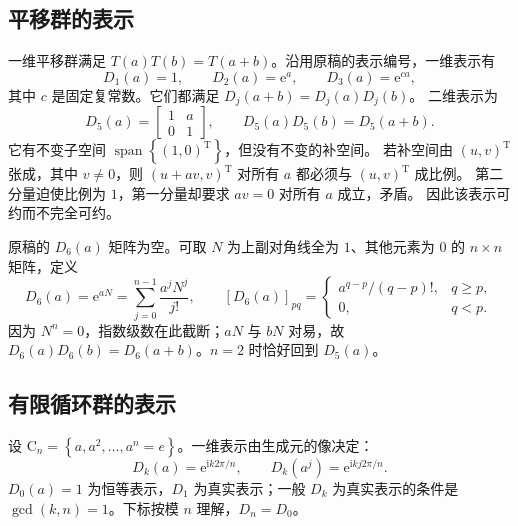 \subsection{平移群的表示}
一维平移群满足 $T\left(a\right)T\left(b\right)=T\left(a+b\right)$。沿用原稿的表示编号，一维表示有
\begin{equation}
D_1\left(a\right)=1,\qquad D_2\left(a\right)=\mathrm{e}^a,\qquad D_3\left(a\right)=\mathrm{e}^{ca},
\end{equation}
其中 $c$ 是固定复常数。它们都满足 $D_j\left(a+b\right)=D_j\left(a\right)D_j\left(b\right)$。
二维表示为
\begin{equation}
D_5\left(a\right)=\begin{bmatrix}1&a\\0&1\end{bmatrix},\qquad
D_5\left(a\right)D_5\left(b\right)=D_5\left(a+b\right).
\end{equation}
它有不变子空间 $\operatorname{span}\left\{\left(1,0\right)^{\mathrm{T}}\right\}$，但没有不变的补空间。
若补空间由 $\left(u,v\right)^{\mathrm{T}}$ 张成，其中 $v\ne0$，则
$\left(u+av,v\right)^{\mathrm{T}}$ 对所有 $a$ 都必须与 $\left(u,v\right)^{\mathrm{T}}$ 成比例。
第二分量迫使比例为 $1$，第一分量却要求 $av=0$ 对所有 $a$ 成立，矛盾。
因此该表示可约而不完全可约。

\begin{remark}
原稿的 $D_6\left(a\right)$ 矩阵为空。可取 $N$ 为上副对角线全为 $1$、其他元素为 $0$ 的
$n\times n$ 矩阵，定义
\begin{equation}
D_6\left(a\right)=\mathrm{e}^{aN}=\sum_{j=0}^{n-1}\frac{a^jN^j}{j!},\qquad
\left[D_6\left(a\right)\right]_{pq}=\begin{cases}a^{q-p}/\left(q-p\right)!,&q\ge p,\\0,&q<p.\end{cases}
\end{equation}
因为 $N^n=0$，指数级数在此截断；$aN$ 与 $bN$ 对易，故
$D_6\left(a\right)D_6\left(b\right)=D_6\left(a+b\right)$。$n=2$ 时恰好回到 $D_5\left(a\right)$。
\end{remark}

\subsection{有限循环群的表示}
设 $\mathrm{C}_n=\left\{a,a^2,\ldots,a^n=e\right\}$。一维表示由生成元的像决定：
\begin{equation}
D_k\left(a\right)=\mathrm{e}^{\mathrm{i} k2\pi/n},\qquad
D_k\left(a^j\right)=\mathrm{e}^{\mathrm{i} kj2\pi/n}.
\end{equation}
$D_0\left(a\right)=1$ 为恒等表示，$D_1$ 为真实表示；一般 $D_k$ 为真实表示的条件是
$\gcd\left(k,n\right)=1$。下标按模 $n$ 理解，$D_n=D_0$。

